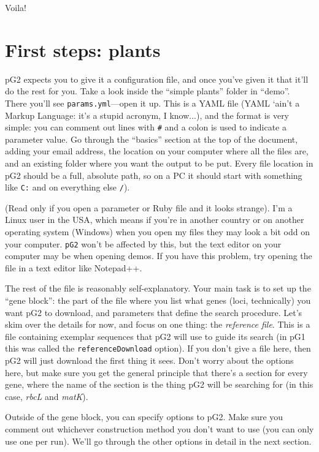 \documentclass[12pt]{article}
\begin{document}
Voila!
  
\section*{First steps: plants}
pG2 expects you to give it a configuration file, and once you've given
it that it'll do the rest for you. Take a look inside the ``simple
plants'' folder in ``demo''. There you'll see
\texttt{params.yml}---open it up. This is a YAML file (YAML `ain't a
Markup Language: it's a stupid acronym, I know...), and the format is
very simple: you can comment out lines with \texttt{\#} and a colon is
used to indicate a parameter value. Go through the ``basics'' section
at the top of the document, adding your email address, the location on
your computer where all the files are, and an existing folder where
you want the output to be put. Every file location in pG2 should be a
full, absolute path, so on a PC it should start with something like
\texttt{C:} and on everything else \texttt{/}).

(Read only if you open a parameter or Ruby file and it looks
strange). I'm a Linux user in the USA, which means if you're in
another country or on another operating system (Windows) when you open
my files they may look a bit odd on your computer. \texttt{pG2} won't
be affected by this, but the text editor on your computer may be when
opening demos. If you have this problem, try opening the file in a
text editor like Notepad++.

The rest of the file is reasonably self-explanatory. Your main task is
to set up the ``gene block'': the part of the file where you list what
genes (loci, technically) you want pG2 to download, and parameters
that define the search procedure. Let's skim over the details for now,
and focus on one thing: the \emph{reference file}. This is a file
containing exemplar sequences that pG2 will use to guide its search
(in pG1 this was called the \texttt{referenceDownload} option). If you
don't give a file here, then pG2 will just download the first thing it
sees. Don't worry about the options here, but make sure you get the
general principle that there's a section for every gene, where the
name of the section is the thing pG2 will be searching for (in this
case, \emph{rbcL} and \emph{matK}).

Outside of the gene block, you can specify options to pG2. Make sure
you comment out whichever construction method you don't want to use
(you can only use one per run). We'll go through the other options in
detail in the next section.
\end{document}
